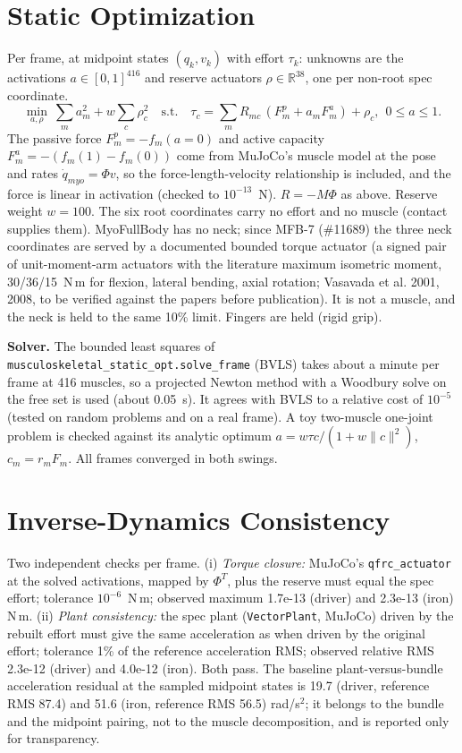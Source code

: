 \documentclass[11pt,a4paper]{article}
\begin{document}
\section{Static Optimization}
Per frame, at midpoint states $(q_k,v_k)$ with effort $\tau_k$: unknowns are the activations $a\in[0,1]^{416}$ and reserve actuators $\rho\in\mathbb{R}^{38}$, one per non-root spec coordinate.
\begin{equation}
\min_{a,\rho}\ \sum_m a_m^2+w\sum_c\rho_c^2\quad\text{s.t.}\quad \tau_c=\sum_m R_{mc}\,(F^{p}_m+a_m F^{a}_m)+\rho_c,\ \ 0\le a\le 1 .
\end{equation}
The passive force $F^p_m=-f_m(a{=}0)$ and active capacity $F^a_m=-(f_m(1)-f_m(0))$ come from MuJoCo's muscle model at the pose and rates $\dot q_{myo}=\Phi v$, so the force-length-velocity relationship is included, and the force is linear in activation (checked to $10^{-13}$~N). $R=-M\Phi$ as above. Reserve weight $w=100$. The six root coordinates carry no effort and no muscle (contact supplies them). MyoFullBody has no neck; since MFB-7 (\#11689) the three neck coordinates are served by a documented bounded torque actuator (a signed pair of unit-moment-arm actuators with the literature maximum isometric moment, 30/36/15~N\,m for flexion, lateral bending, axial rotation; Vasavada et al. 2001, 2008, to be verified against the papers before publication). It is not a muscle, and the neck is held to the same 10\% limit. Fingers are held (rigid grip).

\textbf{Solver.} The bounded least squares of \texttt{musculoskeletal\_static\_opt.solve\_frame} (BVLS) takes about a minute per frame at 416 muscles, so a projected Newton method with a Woodbury solve on the free set is used (about 0.05~s). It agrees with BVLS to a relative cost of $10^{-5}$ (tested on random problems and on a real frame). A toy two-muscle one-joint problem is checked against its analytic optimum $a=w\tau c/(1+w\|c\|^2)$, $c_m=r_mF_m$. All frames converged in both swings.

\section{Inverse-Dynamics Consistency}
Two independent checks per frame. (i) \emph{Torque closure:} MuJoCo's \texttt{qfrc\_actuator} at the solved activations, mapped by $\Phi^T$, plus the reserve must equal the spec effort; tolerance $10^{-6}$~N\,m; observed maximum 1.7e-13 (driver) and 2.3e-13 (iron) N\,m. (ii) \emph{Plant consistency:} the spec plant (\texttt{VectorPlant}, MuJoCo) driven by the rebuilt effort must give the same acceleration as when driven by the original effort; tolerance 1\% of the reference acceleration RMS; observed relative RMS 2.3e-12 (driver) and 4.0e-12 (iron). Both pass. The baseline plant-versus-bundle acceleration residual at the sampled midpoint states is 19.7 (driver, reference RMS 87.4) and 51.6 (iron, reference RMS 56.5) rad/s$^2$; it belongs to the bundle and the midpoint pairing, not to the muscle decomposition, and is reported only for transparency.
\end{document}
